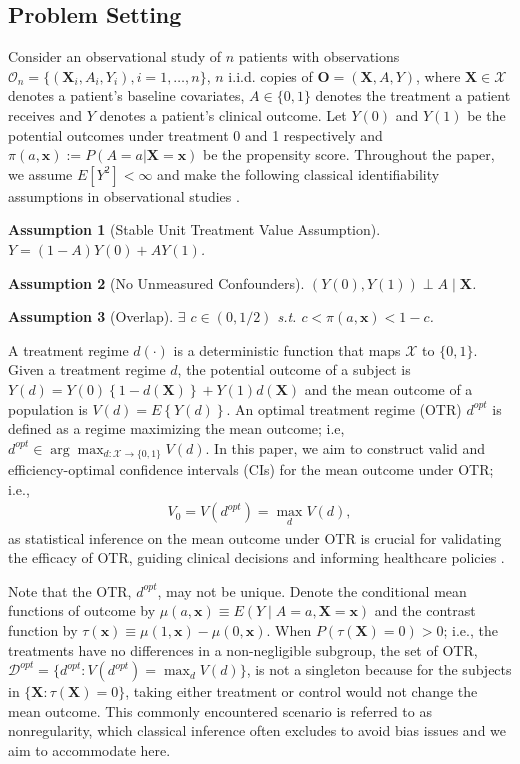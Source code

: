 \documentclass[11pt]{article}
\theoremstyle{referenceplain}
\newtheorem{Assumption}{Assumption}
\theoremstyle{referencedefinition}
\theoremstyle{referenceremark}
\begin{document}
\subsection{Problem Setting}
Consider an observational study of $n$ patients with observations $\mathcal{O}_n=\{(\mathbf{X}_i,A_i,Y_i),i=1,\dots,n\}$, $n$ i.i.d. copies of $\mathbf{O}=(\mathbf{X}, A, Y)$, where $\mathbf{X} \in \mathcal{X}$ denotes a patient's baseline covariates, $A \in\{0,1\}$ denotes the treatment a patient receives and $Y$ denotes a patient's clinical outcome. Let $Y(0)$ and $Y(1)$ be the potential outcomes under treatment 0 and 1 respectively and $\pi(a,\mathbf{x}):=P(A=a|\mathbf{X}=\mathbf{x})$ be the propensity score. Throughout the paper, we assume $E[Y^2]< \infty$ and make the following classical identifiability assumptions in observational studies \citep{ding2023first}.
\begin{Assumption}[Stable Unit Treatment Value Assumption]\label{A1}
    $Y=\left(1-A\right) Y(0)+A Y(1)$.
\end{Assumption}
\begin{Assumption}[No Unmeasured Confounders]\label{A2}
    $(Y(0), Y(1)) \perp A \mid \mathbf{X}$.
\end{Assumption}
\begin{Assumption}[Overlap]\label{A3}
    $\exists$ $c\in(0,1/2)$ s.t. $c< \pi(a,\mathbf{x})<1-c$.
\end{Assumption}
A treatment regime $d(\cdot)$ is a deterministic function that maps $\mathcal{X}$ to $\{0,1\}$. Given a treatment regime $d$, the potential outcome of a subject is $Y(d)=Y(0)\left\{1-d\left(\mathbf{X}\right)\right\}+Y(1) d\left(\mathbf{X}\right)$ and the mean outcome of a population is $V(d)=E\left\{Y(d)\right\}$. An optimal treatment regime (OTR) $d^{o p t}$ is defined as a regime maximizing the mean outcome; i.e, $d^{ {opt }} \in \arg \max_{d:\mathcal{X}\to\{0,1\}}  V(d) $. In this paper, we aim to construct valid and efficiency-optimal confidence intervals (CIs) for the mean outcome under OTR; i.e., 
\begin{align}
    V_0=V(d^{ {opt }})=\max _d V(d),
\end{align}
as statistical inference on the mean outcome under OTR is crucial for validating the efficacy of OTR, guiding clinical decisions and informing healthcare policies \citep{lavori2004dynamic}. 


Note that the OTR, $d^{o p t}$, may not be unique. Denote the conditional mean functions of outcome by $\mu(a, \mathbf{x}) \equiv E\left(Y \mid A=a, \mathbf{X}=\mathbf{x}\right)$ and the contrast function by $\tau(\mathbf{x}) \equiv \mu(1, \mathbf{x})-\mu(0, \mathbf{x})$. When $P(\tau(\mathbf{X})=0)>0$; i.e., the treatments have no differences in a non-negligible subgroup, the set of OTR, $ \mathcal{D}^{ {opt }}=\{d^{o p t}: V\left(d^{o p t}\right)=\max _d V(d)\}$, is not a singleton because for the subjects in $\{\mathbf{X}:\tau(\mathbf{X})=0\}$, taking either treatment or control  would not change the mean outcome. This commonly encountered scenario is referred to as nonregularity, which classical inference often excludes to avoid bias issues \citep{shi2020breaking} and we aim to accommodate here.
\end{document}
